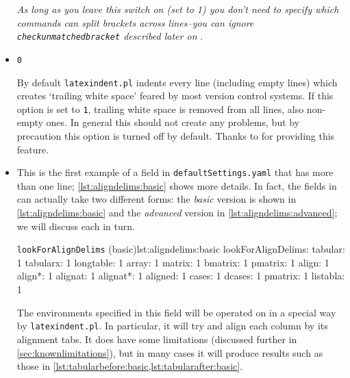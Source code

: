 \documentclass[11pt]{article}
\newcommand{\verbitem}[1]{\small\PVerb{#1}}
\begin{document}
\begin{itemize}
	      \emph{As long as you leave this switch on (set to 1) you don't need to specify which
	      	commands can split brackets across lines--you can ignore \lstinline!checkunmatchedbracket! described later on
	      	}.

	\item[\verbitem{removeTrailingWhitespace}] \lstinline!0!

	      By default \lstinline!latexindent.pl! indents every line (including empty lines)
	      which creates `trailing white space' feared by most version control systems. If
	      this option is set to \lstinline!1!, trailing white space is removed from all
	      lines, also non-empty ones. In general this should not create any problems, but
	      by precaution this option is turned off by default. Thanks to \cite{vosskuhle} for
	      providing this feature.

	\item[\verbitem{lookForAlignDelims}] This is the first example of a field
	      in \lstinline!defaultSettings.yaml! that has more than one line; \cref{lst:aligndelims:basic}
	      shows more details. In fact, the fields in \verbitem{lookForAlignDelims} can actually
          take two different forms: the \emph{basic} version is shown in \cref{lst:aligndelims:basic} 
          and the \emph{advanced} version in \cref{lst:aligndelims:advanced}; we will discuss each in turn.

	      \begin{cmhlistings}[style=yaml]{\lstinline!lookForAlignDelims! (basic)}{lst:aligndelims:basic}
lookForAlignDelims:
   tabular: 1
   tabularx: 1
   longtable: 1
   array: 1
   matrix: 1
   bmatrix: 1
   pmatrix: 1
   align: 1
   align*: 1
   alignat: 1
   alignat*: 1
   aligned: 1
   cases: 1
   dcases: 1
   pmatrix: 1
   listabla: 1
	\end{cmhlistings}

	The environments specified in this field will be operated on in a special way  by \lstinline!latexindent.pl!. In particular, it will try and align each column by its alignment
	tabs. It does have some limitations (discussed further in \cref{sec:knownlimitations}),
	but in many cases it will produce results such as those in \cref{lst:tabularbefore:basic,lst:tabularafter:basic}.


\end{itemize}
\end{document}
